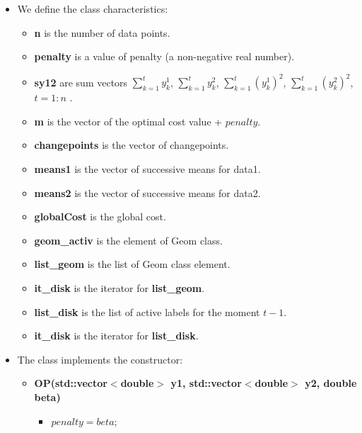 \documentclass{report}
\begin{document}
	\begin{itemize}
		\item We define the class characteristics: 
		
		\begin{itemize}
			\item {\bfseries n} is the number of data points.
			
			\item {\bfseries penalty} is a value of penalty (a non-negative real number).
			
			\item {\bfseries sy12} are sum vectors $\sum_{k=1}^{t} y^1_k$,  $\sum_{k=1}^{t}y^2_k$, $\sum_{k=1}^{t} (y^1_k)^2$,  $\sum_{k=1}^{t} (y^2_k)^2$, $t = 1:n$ .
			
			\item {\bfseries m} is the vector of the optimal cost value + $penalty$.
			
			\item {\bfseries changepoints} is the vector of changepoints.
			
			\item {\bfseries means1} is the vector of successive means for data1.
			
			\item {\bfseries means2} is the vector of successive means for data2.
			
			\item {\bfseries globalCost} is the global cost.
			
			\item {\bfseries geom\_activ} is the element of Geom class.
			
			\item {\bfseries list\_geom} is the list of Geom class element.
			
			\item {\bfseries it\_disk} is the iterator for {\bfseries list\_geom}.
			
			\item {\bfseries list\_disk} is the list of active labels for the moment $t-1$.
			
			\item {\bfseries it\_disk} is the iterator for {\bfseries list\_disk}.
		\end{itemize}
		
		\item The class implements the constructor:
		
		\begin{itemize}
			\item {\bfseries OP(std::vector$<$double$>$ y1, std::vector$<$double$>$ y2, double beta)}
			\begin{itemize}
				\item $penalty = beta$;
				

\end{itemize}
\end{itemize}
\end{itemize}
\end{document}
